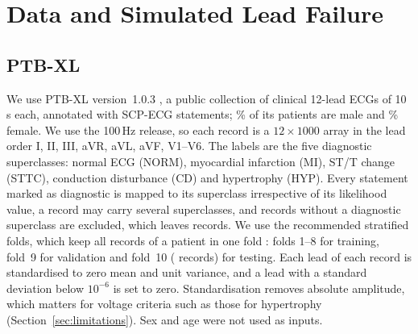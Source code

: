 \section{Data and Simulated Lead Failure}
\label{sec:data}

\subsection{PTB-XL}
\label{sec:data-ptbxl}
We use PTB-XL version~1.0.3 \cite{wagner2020ptbxl,ptbxl103}, a public collection of clinical 12-lead ECGs of 10\,s
each, annotated with SCP-ECG statements; \ptbxlMalePct\% of its patients are male and \ptbxlFemalePct\% female. We use
the 100\,Hz release, so each record is a $12\times1000$ array in the lead order I, II, III, aVR, aVL, aVF, V1--V6. The
labels are the five diagnostic superclasses: normal ECG (NORM), myocardial infarction (MI), ST/T change (STTC),
conduction disturbance (CD) and hypertrophy (HYP). Every statement marked as diagnostic is mapped to its superclass
irrespective of its likelihood value, a record may carry several superclasses, and records without a diagnostic
superclass are excluded, which leaves \nRecordsKept{} records. We use the recommended stratified folds, which keep
all records of a patient in one fold \cite{wagner2020ptbxl,strodthoff2021benchmark}: folds 1--8 for training,
fold~9 for validation and fold~10 (\nTestRecords{} records) for testing. Each lead of each record is standardised to
zero mean and unit variance, and a lead with a standard deviation below $10^{-6}$ is set to zero. Standardisation
removes absolute amplitude, which matters for voltage criteria such as those for hypertrophy
(Section~\ref{sec:limitations}). Sex and age were not used as inputs.

